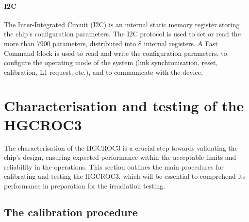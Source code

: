 \paragraph{I2C}
The Inter-Integrated Circuit (I2C) is an internal static memory register storing the chip's configuration parameters.
The I2C protocol is used to set or read the more than 7900 parameters, distributed into 8 internal registers.
A Fast Command block is used to read and write the configuration parameters, to configure the operating mode of the system (link synchronisation, reset, calibration, L1 request, etc.), and to communicate with the device.

\section{Characterisation and testing of the HGCROC3}
\label{sec:Characterisation and testing of the HGCROC3}


The characterisation of the HGCROC3 is a crucial step towards validating the chip's design, ensuring expected performance within the acceptable limits and reliability in the operations.
This section outlines the main procedures for calibrating and testing the HGCROC3, which will be essential to comprehend its performance in preparation for the irradiation testing.




\subsection{The calibration procedure}
\label{subsec:The calibration procedure}

